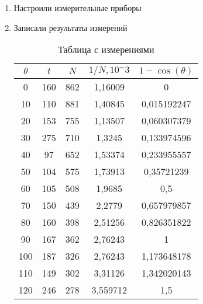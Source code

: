 \documentclass[a4paper,12pt]{article}
\theoremstyle{plain} %
\theoremstyle{definition} %
\theoremstyle{remark} %
\begin{document}
\begin{enumerate}
\item Настроили измерительные приборы
\item Записали результаты измерений
    
\begin{table}[H]
\begin{tabular}{|c|c|c|c|c|}
\hline
\rowcolor[HTML]{FFCE93} 
$\theta$ & $t$   & $N$  & $1/N, 10^-3 $ & $1 - \cos(\theta)$ \\ \hline
0     & 160 & 862 & 1,16009                     & 0                            \\ \hline
10    & 110 & 881 & 1,40845                     & 0,015192247                  \\ \hline
20    & 153 & 755 & 1,13507                     & 0,060307379                  \\ \hline
30    & 275 & 710 & 1,3245                      & 0,133974596                  \\ \hline
40    & 97  & 652 & 1,53374                     & 0,233955557                  \\ \hline
50    & 104 & 575 & 1,73913                     & 0,35721239                   \\ \hline
60    & 105 & 508 & 1,9685                      & 0,5                          \\ \hline
70    & 150 & 439 & 2,2779                      & 0,657979857                  \\ \hline
80    & 160 & 398 & 2,51256                     & 0,826351822                  \\ \hline
90    & 167 & 362 & 2,76243                     & 1                            \\ \hline
100   & 187 & 326 & 2,76243                     & 1,173648178                  \\ \hline
110   & 149 & 302 & 3,31126                     & 1,342020143                  \\ \hline
120   & 246 & 278 & 3,559712                    & 1,5                          \\ \hline
\end{tabular}
\caption{Таблица с измерениями}
\end{table}


\end{enumerate}
\end{document}
